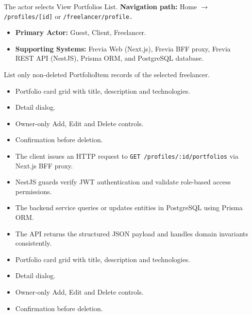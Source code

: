 The actor selects View Portfolios List.\newline
\textbf{Navigation path:} Home $\rightarrow$ \texttt{/\allowbreak{}profiles/\allowbreak{}[id]} or \texttt{/\allowbreak{}freelancer/\allowbreak{}profile.}


\begin{itemize}[leftmargin=1.6em,topsep=3pt,itemsep=2pt,parsep=0pt,label=$\bullet$]
    \item \textbf{Primary Actor:} Guest, Client, Freelancer.
    \item \textbf{Supporting Systems:} Frevia Web (Next.js), Frevia BFF proxy, Frevia REST API (NestJS), Prisma ORM, and PostgreSQL database.
\end{itemize}

\noindent List only non-deleted PortfolioItem records of the selected freelancer.

\begin{itemize}[leftmargin=1.6em,topsep=3pt,itemsep=2pt,parsep=0pt,label=$\bullet$]
    \item Portfolio card grid with title, description and technologies.
    \item Detail dialog.
    \item Owner-only Add, Edit and Delete controls.
    \item Confirmation before deletion.
\end{itemize}

\begin{itemize}[leftmargin=1.6em,topsep=3pt,itemsep=2pt,parsep=0pt,label=$\bullet$]
    \item The client issues an HTTP request to \texttt{GET /\allowbreak{}profiles/\allowbreak{}:\allowbreak{}id/\allowbreak{}portfolios} via Next.js BFF proxy.
    \item NestJS guards verify JWT authentication and validate role-based access permissions.
    \item The backend service queries or updates entities in PostgreSQL using Prisma ORM.
    \item The API returns the structured JSON payload and handles domain invariants consistently.
\end{itemize}

\begin{itemize}[leftmargin=1.6em,topsep=3pt,itemsep=2pt,parsep=0pt,label=$\bullet$]
    \item Portfolio card grid with title, description and technologies.
    \item Detail dialog.
    \item Owner-only Add, Edit and Delete controls.
    \item Confirmation before deletion.
\end{itemize}


